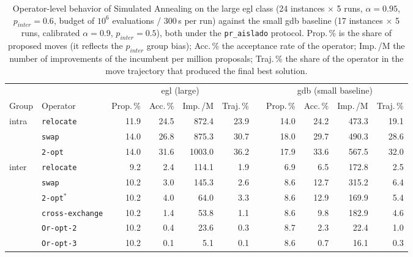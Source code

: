 \begin{table}[htbp]
\centering
\caption{Operator-level behavior of Simulated Annealing on the large egl class (24 instances $\times$ 5 runs, $\alpha=0.95$, $p_{inter}=0.6$, budget of $10^6$ evaluations / 300\,s per run) against the small gdb baseline (17 instances $\times$ 5 runs, calibrated $\alpha=0.9$, $p_{inter}=0.5$), both under the \texttt{pr\_aislado} protocol. Prop.\,\% is the share of proposed moves (it reflects the $p_{inter}$ group bias); Acc.\,\% the acceptance rate of the operator; Imp.\,/M the number of improvements of the incumbent per million proposals; Traj.\,\% the share of the operator in the move trajectory that produced the final best solution.}
\label{tab:sa-operator-analysis}
\small
\begin{tabular}{llrrrrcrrrr}
\toprule
 & & \multicolumn{4}{c}{egl (large)} & \phantom{x} & \multicolumn{4}{c}{gdb (small baseline)} \\
\cmidrule{3-6} \cmidrule{8-11}
Group & Operator & Prop.\,\% & Acc.\,\% & Imp.\,/M & Traj.\,\% & & Prop.\,\% & Acc.\,\% & Imp.\,/M & Traj.\,\% \\
\midrule
intra & \texttt{relocate} & 11.9 & 24.5 & 872.4 & 23.9 & & 14.0 & 24.2 & 473.3 & 19.1 \\
 & \texttt{swap} & 14.0 & 26.8 & 875.3 & 30.7 & & 18.0 & 29.7 & 490.3 & 28.6 \\
 & \texttt{2-opt} & 14.0 & 31.6 & 1003.0 & 36.2 & & 17.9 & 33.6 & 567.5 & 32.0 \\
\midrule
inter & \texttt{relocate} & 9.2 & 2.4 & 114.1 & 1.9 & & 6.9 & 6.5 & 172.8 & 2.5 \\
 & \texttt{swap} & 10.2 & 3.0 & 145.3 & 2.6 & & 8.6 & 12.7 & 315.2 & 6.4 \\
 & \texttt{2-opt$^{*}$} & 10.2 & 4.0 & 64.0 & 3.3 & & 8.6 & 12.9 & 169.9 & 5.4 \\
 & \texttt{cross-exchange} & 10.2 & 1.4 & 53.8 & 1.1 & & 8.6 & 9.8 & 182.9 & 4.6 \\
 & \texttt{Or-opt-2} & 10.2 & 0.4 & 23.6 & 0.3 & & 8.7 & 2.3 & 22.4 & 1.0 \\
 & \texttt{Or-opt-3} & 10.2 & 0.1 & 5.1 & 0.1 & & 8.6 & 0.7 & 16.1 & 0.3 \\
\bottomrule
\end{tabular}
\end{table}